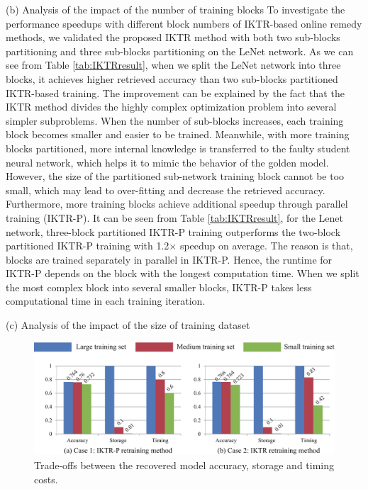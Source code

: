 (b) Analysis of the impact of the number of training blocks
To investigate the performance speedups with different block numbers of IKTR-based online remedy methods, we validated the proposed IKTR method with both two sub-blocks partitioning and three sub-blocks partitioning on the LeNet network. As we can see from Table \ref{tab:IKTRresult}, when we split the LeNet network into three blocks, it achieves higher retrieved accuracy than two sub-blocks partitioned IKTR-based training. The improvement can be explained by the fact that the IKTR method divides the highly complex optimization problem into several simpler subproblems. When the number of sub-blocks increases, each training block becomes smaller and easier to be trained. Meanwhile, with more training blocks partitioned, more internal knowledge is transferred to the faulty student neural network, which helps it to mimic the behavior of the golden model. However, the size of the partitioned sub-network training block cannot be too small, which may lead to over-fitting and decrease the retrieved accuracy. Furthermore, more training blocks achieve additional speedup through parallel training (IKTR-P). It can be seen from Table \ref{tab:IKTRresult}, for the Lenet network, three-block partitioned IKTR-P training outperforms the two-block partitioned IKTR-P training with 1.2$\times$ speedup on average. The reason is that, blocks are trained separately in parallel in IKTR-P. Hence, the runtime for IKTR-P depends on the block with the longest computation time. When we split the most complex block into several smaller blocks, IKTR-P takes less computational time in each training iteration.



(c) Analysis of the impact of the size of training dataset
\begin{figure}
    \centering
    \includegraphics[width=0.75\linewidth]{images/OL-fig17}
    \caption{Trade-offs between the recovered model accuracy, storage and timing costs.}
    \label{fig:differenttrainingset}
    \vspace{-20pt}
\end{figure}

